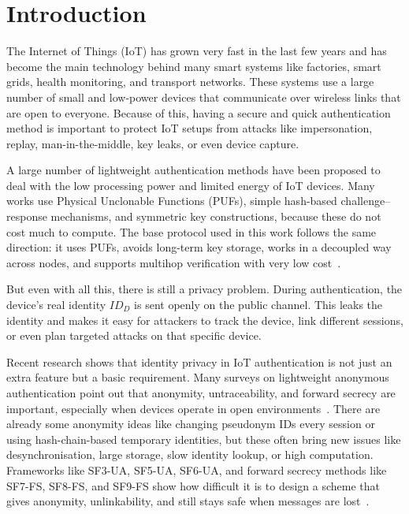 \documentclass[12pt,a4paper]{report}
\begin{document}
\clearpage

\tableofcontents
\clearpage

\listoftables
\clearpage

\listoffigures
\clearpage


\chapter{Introduction}

The Internet of Things (IoT) has grown very fast in the last few years and has become
the main technology behind many smart systems like factories, smart grids, health
monitoring, and transport networks.
These systems use a large number of small and low-power devices that communicate over
wireless links that are open to everyone.
Because of this, having a secure and quick authentication method is important to
protect IoT setups from attacks like impersonation, replay, man-in-the-middle, key
leaks, or even device capture.

A large number of lightweight authentication methods have been proposed to deal with
the low processing power and limited energy of IoT devices.
Many works use Physical Unclonable Functions (PUFs), simple hash-based
challenge--response mechanisms, and symmetric key constructions, because these do
not cost much to compute.
The base protocol used in this work follows the same direction: it uses PUFs, avoids
long-term key storage, works in a decoupled way across nodes, and supports multihop
verification with very low cost~\cite{das2026comsnets}.

But even with all this, there is still a privacy problem.
During authentication, the device's real identity $ID_D$ is sent openly on the
public channel.
This leaks the identity and makes it easy for attackers to track the device, link
different sessions, or even plan targeted attacks on that specific device.

Recent research shows that identity privacy in IoT authentication is not just an extra
feature but a basic requirement.
Many surveys on lightweight anonymous authentication point out that anonymity,
untraceability, and forward secrecy are important, especially when devices operate
in open environments~\cite{zhong2025survey}.
There are already some anonymity ideas like changing pseudonym IDs every session or
using hash-chain-based temporary identities, but these often bring new issues like
desynchronisation, large storage, slow identity lookup, or high computation.
Frameworks like SF3-UA, SF5-UA, SF6-UA, and forward secrecy methods like SF7-FS,
SF8-FS, and SF9-FS show how difficult it is to design a scheme that gives anonymity,
unlinkability, and still stays safe when messages are lost~\cite{zhong2025survey}.
\end{document}

